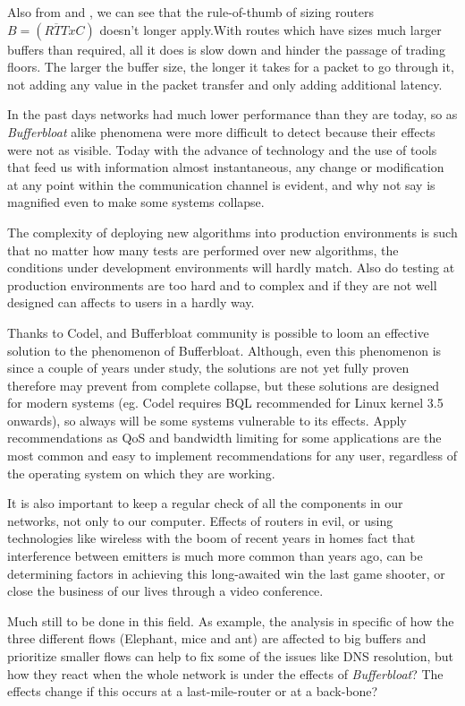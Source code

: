 Also from \cite{main:ref:1} and \cite{Vu-Brugier}, we can see that the rule-of-thumb of sizing routers $B = (\overline{RTT}xC)$ doesn't longer apply.With
routes which have sizes much larger buffers than required, all it does is slow
down and hinder the passage of trading floors. The larger the buffer size, the
longer it takes for a packet to go through it, not adding any value in the
packet transfer and only adding additional latency.

In the past days networks had much lower performance than they are today,
so as \emph{Bufferbloat} alike phenomena were more difficult to detect
because their effects were not as visible. Today with the advance of
technology and the use of tools that feed us with information almost
instantaneous, any change or modification at any point within the
communication channel is evident, and why not say is magnified even to make
some systems collapse.

The complexity of deploying new algorithms into production environments is
such that no matter how many tests are performed over new algorithms, the
conditions under development environments will hardly match. Also do testing
at production environments are too hard and to complex\cite{Vu-Brugier} and if
they are not well designed can affects to users in a hardly way.

Thanks to Codel, and Bufferbloat community is possible to loom an effective
solution to the phenomenon of Bufferbloat. Although, even this phenomenon is
since a couple of years under study, the solutions are not yet fully proven
therefore may prevent from complete collapse, but these solutions are designed
for modern systems (eg. Codel requires BQL recommended for Linux kernel 3.5
onwards), so always will be some systems vulnerable to its effects. Apply
recommendations as QoS and bandwidth limiting for some applications are the
most common and easy to implement recommendations for any user, regardless of
the operating system on which they are working.

It is also important to keep a regular check of all the components in our
networks, not only to our computer. Effects of routers in evil, or using
technologies like wireless with the boom of recent years in homes fact that
interference between emitters is much more common than years ago, can be
determining factors in achieving this long-awaited win the last game shooter,
or close the business of our lives through a video conference.

Much still to be done in this field. As example, the analysis in specific of
how the three different flows (Elephant, mice and
ant)\cite{HaElephants}\cite{evolvshortlongflows} are affected to big buffers
and prioritize smaller flows can help to fix some of the issues like DNS
resolution, but how they react when the whole network is under the effects of
\emph{Bufferbloat}? The effects change if this occurs at a last-mile-router
or at a back-bone?

